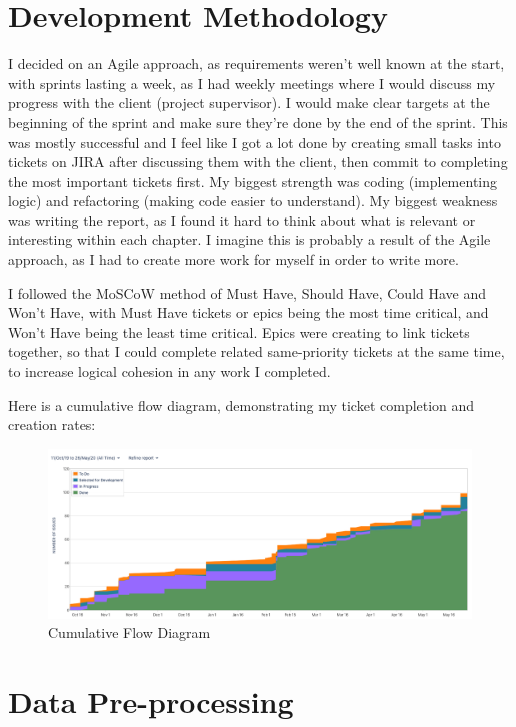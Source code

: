 \documentclass{article}
\begin{document}
\newpage
\section{Development Methodology}

I decided on an Agile approach, as requirements weren't well known at the start, with sprints lasting a week, as I had weekly meetings where I would discuss my progress with the client (project supervisor).
I would make clear targets at the beginning of the sprint and make sure they're done by the end of the sprint.
This was mostly successful and I feel like I got a lot done by creating small tasks into tickets on JIRA after discussing them with the client, then commit to completing the most important tickets first.
My biggest strength was coding (implementing logic) and refactoring (making code easier to understand).
My biggest weakness was writing the report, as I found it hard to think about what is relevant or interesting within each chapter.
I imagine this is probably a result of the Agile approach, as I had to create more work for myself in order to write more.

I followed the MoSCoW method of Must Have, Should Have, Could Have and Won't Have, with Must Have tickets or epics being the most time critical, and Won't Have being the least time critical.
Epics were creating to link tickets together, so that I could complete related same-priority tickets at the same time, to increase logical cohesion in any work I completed.

Here is a cumulative flow diagram, demonstrating my ticket completion and creation rates:
\begin{figure}[H]
	\includegraphics[width=\linewidth]{images/cum_flow_diagram.png}
	\caption{Cumulative Flow Diagram}
	\label{fig:cfd}
\end{figure}

\newpage
\section{Data Pre-processing}
\end{document}
